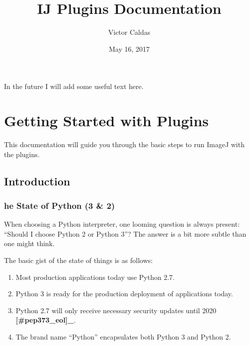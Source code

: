 \documentclass[letterpaper,10pt,english]{sphinxmanual}
\title{IJ Plugins Documentation}
\date{May 16, 2017}
\author{Victor Caldas}
\begin{document}
\maketitle
\sphinxtableofcontents
{}\label{\detokenize{index::doc}}


In the future I will add some useful text here.


\chapter{Getting Started with Plugins}
\label{\detokenize{index:welcome-to-ij-plugins-s-documentation}}\label{\detokenize{index:getting-started-with-plugins}}
This documentation will guide you through the basic steps to run ImageJ with the plugins.


\section{Introduction}
\label{\detokenize{starting/intro::doc}}\label{\detokenize{starting/intro:introduction}}

\subsection{he State of Python (3 \& 2)}
\label{\detokenize{starting/intro:he-state-of-python-3-2}}\label{\detokenize{starting/intro:intro}}
When choosing a Python interpreter, one looming question is always present:
``Should I choose Python 2 or Python 3''? The answer is a bit more subtle than
one might think.

The basic gist of the state of things is as follows:
\begin{enumerate}
\item {} 
Most production applications today use Python 2.7.

\item {} 
Python 3 is ready for the production deployment of applications today.

\item {} 
Python 2.7 will only receive necessary security updates until 2020 {\color{red}\bfseries{}{[}\#pep373\_eol{]}\_}.

\item {} 
The brand name ``Python'' encapsulates both Python 3 and Python 2.

\end{enumerate}
\end{document}
